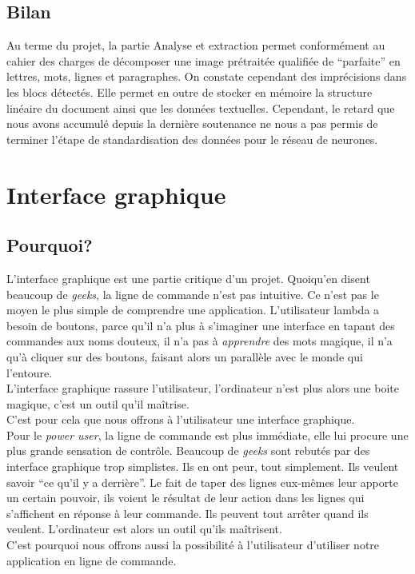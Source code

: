 \documentclass[a4paper,12pt]{report}
\begin{document}
\section{Bilan}

Au terme du projet, la partie Analyse et extraction permet conformément au cahier des
charges de décomposer une image prétraitée qualifiée de ``parfaite'' en lettres, mots, lignes
et paragraphes. On constate cependant des imprécisions dans les blocs détectés. Elle
permet en outre de stocker en mémoire la structure linéaire du document ainsi que les
données textuelles. Cependant, le retard que nous avons accumulé depuis la dernière
soutenance ne nous a pas permis de terminer l'étape de standardisation des données pour
le réseau de neurones.



\chapter{Interface graphique} %
\label{cha:interface_graphique}

\section{Pourquoi?} %
\label{sec:pourquoi_}
L’interface graphique est une partie critique d’un projet. Quoiqu’en disent beaucoup de \emph{geeks}, la ligne de commande n’est pas intuitive. Ce n’est pas le moyen le plus simple de comprendre une application. L’utilisateur lambda a besoin de boutons, parce qu’il n’a plus à s’imaginer une interface en tapant des commandes aux noms douteux, il n’a pas à \emph{apprendre} des mots magique, il n’a qu’à cliquer sur des boutons, faisant alors un parallèle avec le monde qui l’entoure. \\
L’interface graphique rassure l’utilisateur, l’ordinateur n’est plus alors une boite magique, c’est un outil qu’il maîtrise. \\
C’est pour cela que nous offrons à l’utilisateur une interface graphique.\\

Pour le \emph{power user}, la ligne de commande est plus immédiate, elle lui procure une plus grande sensation de contrôle. Beaucoup de \emph{geeks} sont rebutés par des interface graphique trop simplistes. Ils en ont peur, tout simplement. Ils veulent savoir ``ce qu’il y a derrière''. Le fait de taper des lignes eux-mêmes leur apporte un certain pouvoir, ils voient le résultat de leur action dans les lignes qui s’affichent en réponse à leur commande. Ils peuvent tout arrêter quand ils veulent. L’ordinateur est alors un outil qu’ils maîtrisent. \\
C’est pourquoi nous offrons aussi la possibilité à l’utilisateur d’utiliser notre application en ligne de commande.
\end{document}
